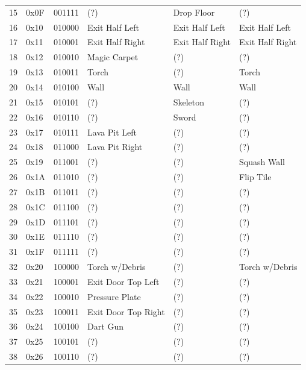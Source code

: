 \documentclass{article}
\begin{document}
\begin{longtable}{llllll}
 15 & 0x0F & 001111 & (?)                & Drop Floor        & (?) \\
 16 & 0x10 & 010000 & Exit Half Left     & Exit Half Left    & Exit Half Left \\
 17 & 0x11 & 010001 & Exit Half Right    & Exit Half Right   & Exit Half Right \\
 18 & 0x12 & 010010 & Magic Carpet       & (?)               & (?) \\
 19 & 0x13 & 010011 & Torch              & (?)               & Torch \\
 20 & 0x14 & 010100 & Wall               & Wall              & Wall \\
 21 & 0x15 & 010101 & (?)                & Skeleton          & (?) \\
 22 & 0x16 & 010110 & (?)                & Sword             & (?) \\
 23 & 0x17 & 010111 & Lava Pit Left      & (?)               & (?) \\
 24 & 0x18 & 011000 & Lava Pit Right     & (?)               & (?) \\
 25 & 0x19 & 011001 & (?)                & (?)               & Squash Wall \\
 26 & 0x1A & 011010 & (?)                & (?)               & Flip Tile \\
 27 & 0x1B & 011011 & (?)                & (?)               & (?) \\
 28 & 0x1C & 011100 & (?)                & (?)               & (?) \\
 29 & 0x1D & 011101 & (?)                & (?)               & (?) \\
 30 & 0x1E & 011110 & (?)                & (?)               & (?) \\
 31 & 0x1F & 011111 & (?)                & (?)               & (?) \\
 32 & 0x20 & 100000 & Torch w/Debris     & (?)               & Torch w/Debris \\
 33 & 0x21 & 100001 & Exit Door Top Left & (?)               & (?) \\
 34 & 0x22 & 100010 & Pressure Plate     & (?)               & (?) \\
 35 & 0x23 & 100011 & Exit Door Top Right& (?)               & (?) \\
 36 & 0x24 & 100100 & Dart Gun           & (?)               & (?) \\
 37 & 0x25 & 100101 & (?)                & (?)               & (?) \\
 38 & 0x26 & 100110 & (?)                & (?)               & (?) \\

\end{longtable}
\end{document}
